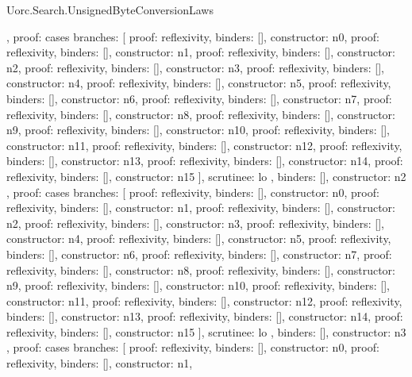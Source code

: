 \begin{lexlean}{Uorc.Search.UnsignedByteConversionLaws}
\begin{semanticmodule}
{{{      },
      {
        proof: cases{
          branches: [
            {proof: reflexivity{}, binders: [], constructor: n0},
            {proof: reflexivity{}, binders: [], constructor: n1},
            {proof: reflexivity{}, binders: [], constructor: n2},
            {proof: reflexivity{}, binders: [], constructor: n3},
            {proof: reflexivity{}, binders: [], constructor: n4},
            {proof: reflexivity{}, binders: [], constructor: n5},
            {proof: reflexivity{}, binders: [], constructor: n6},
            {proof: reflexivity{}, binders: [], constructor: n7},
            {proof: reflexivity{}, binders: [], constructor: n8},
            {proof: reflexivity{}, binders: [], constructor: n9},
            {proof: reflexivity{}, binders: [], constructor: n10},
            {proof: reflexivity{}, binders: [], constructor: n11},
            {proof: reflexivity{}, binders: [], constructor: n12},
            {proof: reflexivity{}, binders: [], constructor: n13},
            {proof: reflexivity{}, binders: [], constructor: n14},
            {proof: reflexivity{}, binders: [], constructor: n15}
          ],
          scrutinee: lo
        },
        binders: [],
        constructor: n2
      },
      {
        proof: cases{
          branches: [
            {proof: reflexivity{}, binders: [], constructor: n0},
            {proof: reflexivity{}, binders: [], constructor: n1},
            {proof: reflexivity{}, binders: [], constructor: n2},
            {proof: reflexivity{}, binders: [], constructor: n3},
            {proof: reflexivity{}, binders: [], constructor: n4},
            {proof: reflexivity{}, binders: [], constructor: n5},
            {proof: reflexivity{}, binders: [], constructor: n6},
            {proof: reflexivity{}, binders: [], constructor: n7},
            {proof: reflexivity{}, binders: [], constructor: n8},
            {proof: reflexivity{}, binders: [], constructor: n9},
            {proof: reflexivity{}, binders: [], constructor: n10},
            {proof: reflexivity{}, binders: [], constructor: n11},
            {proof: reflexivity{}, binders: [], constructor: n12},
            {proof: reflexivity{}, binders: [], constructor: n13},
            {proof: reflexivity{}, binders: [], constructor: n14},
            {proof: reflexivity{}, binders: [], constructor: n15}
          ],
          scrutinee: lo
        },
        binders: [],
        constructor: n3
      },
      {
        proof: cases{
          branches: [
            {proof: reflexivity{}, binders: [], constructor: n0},
            {proof: reflexivity{}, binders: [], constructor: n1},
}}}}
\end{semanticmodule}
\end{lexlean}
